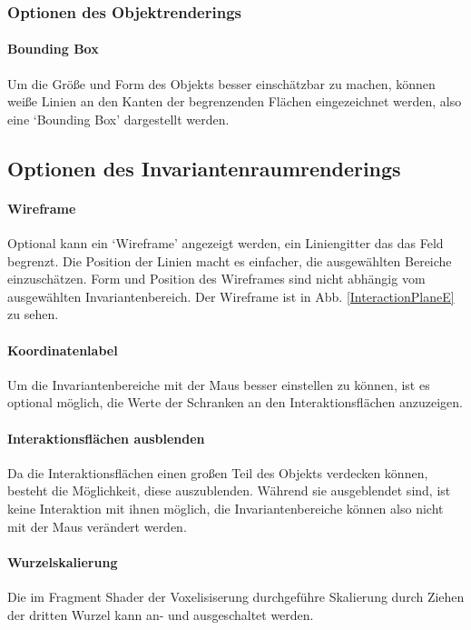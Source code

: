 \documentclass[a4paper,fontsize=12pt,toc=bib,halfparskip]{scrartcl}
\begin{document}
\subsubsection{Optionen des Objektrenderings}

\paragraph{Bounding Box}
Um die Gr\"o{\ss}e und Form des Objekts besser einsch\"atzbar zu machen, k\"onnen wei{\ss}e Linien an den Kanten der begrenzenden Fl\"achen eingezeichnet werden, also eine `Bounding Box' dargestellt werden.

\subsection{Optionen des Invariantenraumrenderings}
\paragraph{Wireframe}
Optional kann ein `Wireframe' angezeigt werden, ein Liniengitter das das Feld begrenzt. Die Position der Linien macht es einfacher, die ausgew\"ahlten Bereiche einzusch\"atzen. Form und Position des Wireframes sind nicht abh\"angig vom ausgew\"ahlten Invariantenbereich. Der Wireframe ist in Abb. \ref{InteractionPlaneE} zu sehen.
\paragraph{Koordinatenlabel}
Um die Invariantenbereiche mit der Maus besser einstellen zu k\"onnen, ist es optional m\"oglich, die Werte der Schranken an den Interaktionsfl\"achen anzuzeigen.

\paragraph{Interaktionsfl\"achen ausblenden}
Da die Interaktionsfl\"achen einen gro{\ss}en Teil des Objekts verdecken k\"onnen, besteht die M\"oglichkeit, diese auszublenden. W\"ahrend sie ausgeblendet sind, ist keine Interaktion mit ihnen m\"oglich, die Invariantenbereiche k\"onnen also nicht mit der Maus ver\"andert werden.

\paragraph{Wurzelskalierung}
Die im Fragment Shader der Voxelisiserung durchgef\"uhre Skalierung durch Ziehen der dritten Wurzel kann an- und ausgeschaltet werden.
\end{document}
